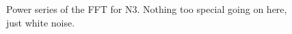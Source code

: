 \documentclass[twocolumn,11pt]{article}
\begin{document}
\begin{figure}[!h]
	\centering
	\noindent
      \caption{Power series of the FFT for N3. Nothing too special going on here, just white noise.}
\end{figure}
\end{document}

